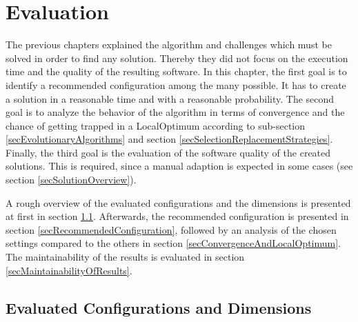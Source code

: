 \chapter{Evaluation}\label{chapEvaluation}

The previous chapters explained the algorithm and challenges which must be solved in order to find any solution. Thereby they did not focus on the execution time and the quality of the resulting software. In this chapter, the first goal is to identify a recommended configuration among the many possible. It has to create a solution in a reasonable time and with a reasonable probability. The second goal is to analyze the behavior of the algorithm in terms of convergence and the chance of getting trapped in a \gls{LocalOptimum} according to sub-section \ref{secEvolutionaryAlgorithms} and section \ref{secSelectionReplacementStrategies}. Finally, the third goal is the evaluation of the software quality of the created solutions. This is required, since a manual adaption is expected in some cases (see section \ref{secSolutionOverview}).

A rough overview of the evaluated configurations and the dimensions is presented at first in section \ref{secEvaluatedConfigurationsAndDimensions}. Afterwards, the recommended configuration is presented in section \ref{secRecommendedConfiguration}, followed by an analysis of the chosen settings compared to the others in section \ref{secConvergenceAndLocalOptimum}. The maintainability of the results is evaluated in section \ref{secMaintainabilityOfResults}.

\section{Evaluated Configurations and Dimensions}
\label{secEvaluatedConfigurationsAndDimensions}

